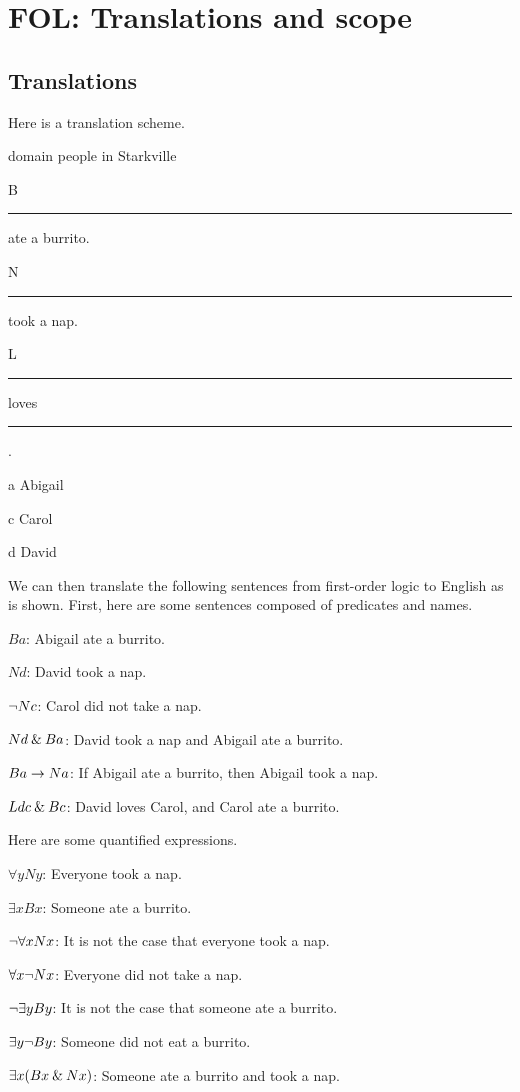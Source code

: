 \graphicspath{{figures--proofs/}}

\chapter{FOL: Translations and scope}\label{FOL-basics}

\section{Translations}

Here is a translation scheme.

\begin{ekey}
	\item[\textrm{domain}] people in Starkville
	\item[B] \rule{1cm}{0.15mm} ate a burrito.
	\item[N] \rule{1cm}{0.15mm} took a nap.
	\item[L] \rule{1cm}{0.15mm} loves \rule{1cm}{0.15mm} .
	\item[a] Abigail
	\item[c] Carol
	\item[d] David
\end{ekey}

\noindent We can then translate the following sentences from first-order logic to English as is shown. First, here are some sentences composed of predicates and names.

\begin{ebullet}
	\item[]$Ba $: Abigail ate a burrito.\smallskip
	\item[]$Nd $: David took a nap.\smallskip
	\item[]${\neg} Nc$: Carol did not take a nap.\smallskip
	\item[]$Nd \mathbin{\&} Ba $: David took a nap and Abigail ate a burrito.\smallskip
	\item[]$Ba \rightarrow Na$: If Abigail ate a burrito, then Abigail took a nap.\smallskip
	\item[]$Ldc \mathbin{\&} Bc$: David loves Carol, and Carol ate a burrito.
\end{ebullet}

\noindent Here are some quantified expressions.

\begin{ebullet}
	\item[] $\forall y Ny$: Everyone took a nap.\smallskip
	\item[] $\exists x Bx$: Someone ate a burrito.\smallskip
	\item[] ${\neg}\forall xNx$: It is not the case that everyone took a nap.\smallskip
	\item[]$\forall x {\neg} Nx$: Everyone did not take a nap.\smallskip
	\item[]${\neg}\exists yBy$: It is not the case that someone ate a burrito.\smallskip
	\item[]$\exists y {\neg} By$: Someone did not eat a burrito.\smallskip
	\item[]$\exists x(Bx \mathbin{\&} Nx)$: Someone ate a burrito and took a nap.\smallskip
\end{ebullet}
	
